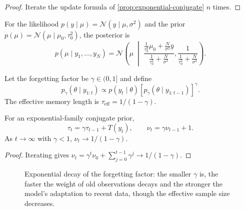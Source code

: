 \begin{proof}
Iterate the update formula of \cref{prop:exponential-conjugate} $n$ times.
\end{proof}

\begin{example}\label{ex:gaussian-conjugate}
For the likelihood $p(y\mid\mu)=\mathcal{N}(y\mid\mu,\sigma^2)$ and the prior $p(\mu)=\mathcal{N}(\mu\mid\mu_0,\tau_0^2)$, the posterior is
\[
p(\mu\mid y_1,\dots,y_N)
=\mathcal{N}\left(
\mu\;\middle|\;
\frac{\frac{1}{\tau_0^2}\mu_0+\frac{N}{\sigma^2}\bar{y}}{\frac{1}{\tau_0^2}+\frac{N}{\sigma^2}},
\frac{1}{\frac{1}{\tau_0^2}+\frac{N}{\sigma^2}}
\right).
\]
\end{example}

\begin{definition}\label{def:forgetting-bayes}
Let the forgetting factor be $\gamma\in(0,1]$ and define
\[
p_\gamma(\theta\mid y_{1:t})
\propto p(y_t\mid\theta)\left[p_\gamma(\theta\mid y_{1:t-1})\right]^\gamma.
\]
The effective memory length is $\tau_{\text{eff}}=1/(1-\gamma)$.
\end{definition}

\begin{proposition}\label{prop:forgetting-precision}
For an exponential-family conjugate prior,
\[
\tau_t=\gamma\tau_{t-1}+T(y_t),\qquad
\nu_t=\gamma\nu_{t-1}+1.
\]
As $t\to\infty$ with $\gamma<1$, $\nu_t\to1/(1-\gamma)$.
\end{proposition}

\begin{proof}
Iterating gives $\nu_t=\gamma^t\nu_0+\sum_{j=0}^{t-1}\gamma^j\to1/(1-\gamma)$.
\end{proof}

\begin{figure}[htbp]
\centering
{}
\caption{Exponential decay of the forgetting factor: the smaller $\gamma$ is, the faster the weight of old observations decays and the stronger the model's adaptation to recent data, though the effective sample size decreases.}
\label{fig:ps_forgetting_factor}
\end{figure}

